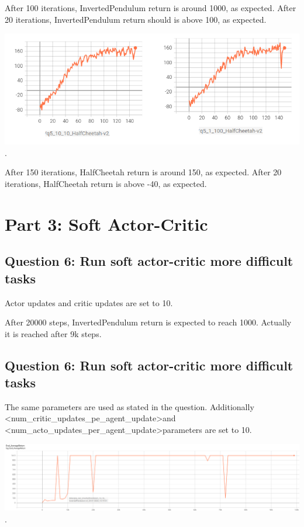 \documentclass[11pt]{article}
\begin{document}
    After 100 iterations, InvertedPendulum return is around 1000, as expected.
    After 20 iterations, InvertedPendulum return should is above 100, as expected.

    \includegraphics[scale=2]{q5/q5_half_cheetah}.

    After 150 iterations, HalfCheetah return is around 150, as expected.
    After 20 iterations, HalfCheetah return is above -40, as expected.

    \section{Part 3: Soft Actor-Critic}

    \subsection*{Question 6: Run soft actor-critic more difficult tasks}

    Actor updates and critic updates are set to 10.

    After 20000 steps, InvertedPendulum return is expected to reach 1000.
    Actually it is reached after 9k steps.

    \subsection*{Question 6: Run soft actor-critic more difficult tasks}

    The same parameters are used as stated in the question.
    Additionally \textless num\_critic\_updates\_pe\_agent\_update\textgreater and \textless num\_acto\_updates\_per\_agent\_update\textgreater parameters are set to 10.

    \includegraphics[scale=0.66]{q6/inverted_pendulum}.
\end{document}
